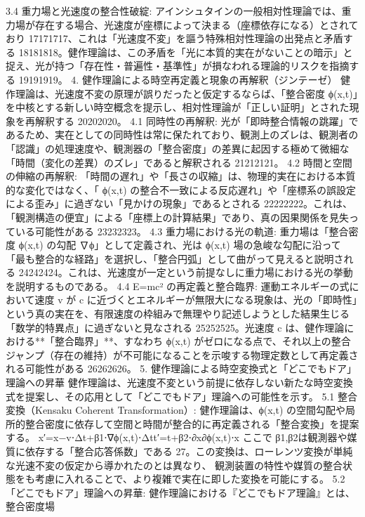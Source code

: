 \documentclass{article}
\begin{document}
3.4 重力場と光速度の整合性破綻:
アインシュタインの一般相対性理論では、重力場が存在する場合、光速度が座標によって決まる（座標依存になる）とされており 17171717、これは「光速度不変」を謳う特殊相対性理論の出発点と矛盾する 18181818。健作理論は、この矛盾を「光に本質的実在がないことの暗示」と捉え、光が持つ「存在性・普遍性・基準性」が損なわれる理論的リスクを指摘する 19191919。
4. 健作理論による時空再定義と現象の再解釈（ジンテーゼ）
健作理論は、光速度不変の原理が誤りだったと仮定するならば、「整合密度 
ϕ(x,t)」を中核とする新しい時空概念を提示し、相対性理論が「正しい証明」とされた現象を再解釈する 20202020。
4.1 同時性の再解釈:
光が「即時整合情報の跳躍」であるため、実在としての同時性は常に保たれており、観測上のズレは、観測者の「認識」の処理速度や、観測器の「整合密度」の差異に起因する極めて微細な「時間（変化の差異）のズレ」であると解釈される 21212121。
4.2 時間と空間の伸縮の再解釈:
「時間の遅れ」や「長さの収縮」は、物理的実在における本質的な変化ではなく、「
ϕ(x,t) の整合不一致による反応遅れ」や「座標系の誤設定による歪み」に過ぎない「見かけの現象」であるとされる 22222222。これは、「観測構造の便宜」による「座標上の計算結果」であり、真の因果関係を見失っている可能性がある 23232323。
4.3 重力場における光の軌道:
重力場は「整合密度 
ϕ(x,t) の勾配 ∇ϕ」として定義され、光は ϕ(x,t) 場の急峻な勾配に沿って「最も整合的な経路」を選択し、「整合円弧」として曲がって見えると説明される 24242424。これは、光速度が一定という前提なしに重力場における光の挙動を説明するものである。
4.4 E=mc² の再定義と整合臨界:
運動エネルギーの式において速度 
v が c に近づくとエネルギーが無限大になる現象は、光の「即時性」という真の実在を、有限速度の枠組みで無理やり記述しようとした結果生じる「数学的特異点」に過ぎないと見なされる 25252525。光速度 
c は、健作理論における**「整合臨界」**、すなわち ϕ(x,t) がゼロになる点で、それ以上の整合ジャンプ（存在の維持）が不可能になることを示唆する物理定数として再定義される可能性がある 26262626。
5. 健作理論による時空変換式と「どこでもドア」理論への昇華
健作理論は、光速度不変という前提に依存しない新たな時空変換式を提案し、その応用として「どこでもドア」理論への可能性を示す。
5.1 整合変換（Kensaku Coherent Transformation）:
健作理論は、ϕ(x,t) の空間勾配や局所的整合密度に依存して空間と時間が整合的に再定義される「整合変換」を提案する。
x′=x−v⋅Δt+β1​⋅∇ϕ(x,t)⋅Δtt′=t+β2​⋅∂x∂ϕ(x,t)​⋅x
ここで 
β1​,β2​ は観測器や媒質に依存する「整合応答係数」である 27。この変換は、ローレンツ変換が単純な光速不変の仮定から導かれたのとは異なり、
観測装置の特性や媒質の整合状態をも考慮に入れることで、より複雑で実在に即した変換を可能にする。
5.2 「どこでもドア」理論への昇華:
健作理論における『どこでもドア理論』とは、整合密度場 
\end{document}
